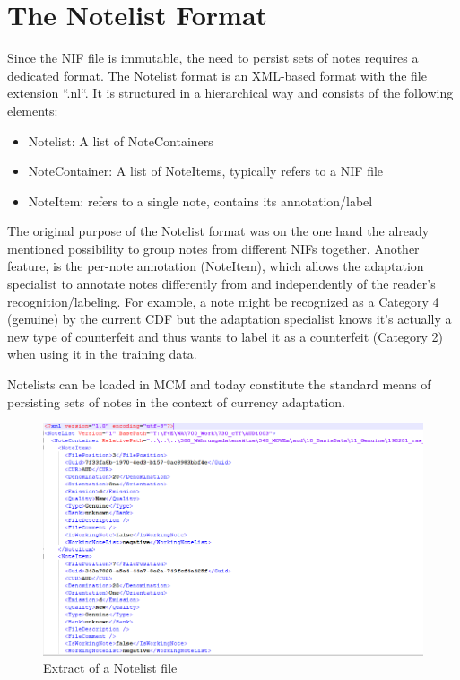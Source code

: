 \section{The Notelist Format}
\label{section:notelist}
Since the NIF file is immutable, the need to persist sets of notes requires a dedicated format. The Notelist format is an XML-based format with the file extension ``.nl``. It is structured in a hierarchical way and consists of the following elements:
\begin{itemize}
	\item Notelist: A list of NoteContainers
	\item NoteContainer: A list of NoteItems, typically refers to a NIF file
	\item NoteItem: refers to a single note, contains its annotation/label
\end{itemize}	
The original purpose of the Notelist format was on the one hand the already mentioned possibility to group notes from different NIFs together. Another feature, is the per-note annotation (NoteItem), which allows the adaptation specialist to annotate notes differently from and independently of the reader's recognition/labeling. For example, a note might be recognized as a Category 4 (genuine) by the current CDF but the adaptation specialist knows it's actually a new type of counterfeit and thus wants to label it as a counterfeit (Category 2) when using it in the training data.\par
Notelists can be loaded in MCM and today constitute the standard means of persisting sets of notes in the context of currency adaptation. 
\begin{figure}[ht!]
\includegraphics[width=1.0\textwidth]{images/Notelist.png}
  \caption{Extract of a Notelist file}\label{fig:notelist}
\end{figure}